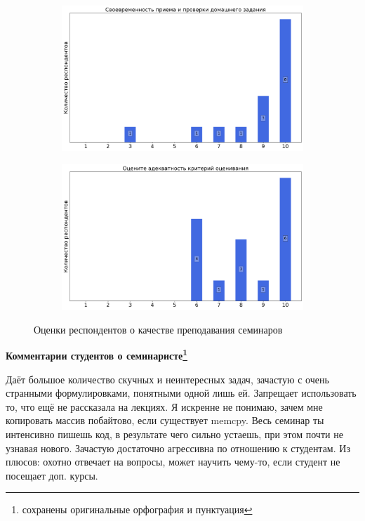 \begin{figure}[H]
\begin{subfigure}[b]{0.45\textwidth}
                \includegraphics[width=\textwidth]{images/1 course/Информатика/seminarists-marks-Дивари И.Н.-2.png}
            \end{subfigure}
            \begin{subfigure}[b]{0.45\textwidth}
                \centering
                \includegraphics[width=\textwidth]{images/1 course/Информатика/seminarists-marks-Дивари И.Н.-3.png}
            \end{subfigure}	
            \caption{Оценки респондентов о качестве преподавания семинаров}
        \end{figure}

        \textbf{Комментарии студентов о семинаристе\protect\footnote{сохранены оригинальные орфография и пунктуация}}
            \begin{commentbox} 
                Даёт большое количество скучных и неинтересных задач, зачастую с очень странными формулировками, понятными одной лишь ей. Запрещает использовать то, что ещё не рассказала на лекциях. Я искренне не понимаю, зачем мне копировать массив побайтово, если существует memcpy. Весь семинар ты интенсивно пишешь код, в результате чего сильно устаешь, при этом почти не узнавая нового. Зачастую достаточно агрессивна по отношению к студентам. Из плюсов: охотно отвечает на вопросы, может научить чему-то, если студент не посещает доп. курсы. 
            \end{commentbox} 
        
